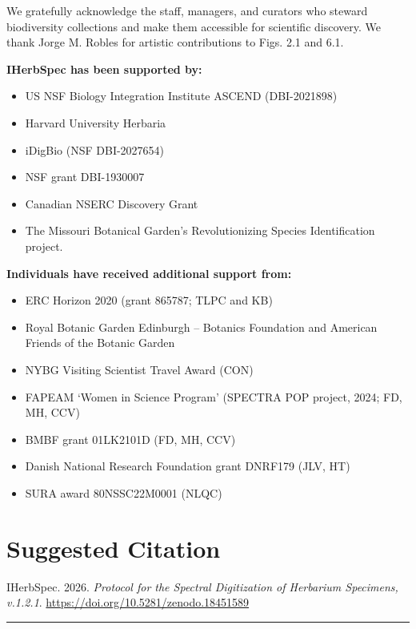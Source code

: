 \documentclass[
  letterpaper,
  DIV=11,
  numbers=noendperiod]{scrreprt}
\providecommand{\tightlist}{%
  \setlength{\itemsep}{0pt}\setlength{\parskip}{0pt}}
\begin{document}
We gratefully acknowledge the staff, managers, and curators who steward
biodiversity collections and make them accessible for scientific
discovery. We thank Jorge M. Robles for artistic contributions to Figs.
2.1 and 6.1.

\textbf{IHerbSpec has been supported by:}

\begin{itemize}
\tightlist
\item
  US NSF Biology Integration Institute ASCEND (DBI-2021898)
\item
  Harvard University Herbaria
\item
  iDigBio (NSF DBI-2027654)
\item
  NSF grant DBI-1930007
\item
  Canadian NSERC Discovery Grant
\item
  The Missouri Botanical Garden's Revolutionizing Species Identification
  project.
\end{itemize}

\textbf{Individuals have received additional support from:}

\begin{itemize}
\tightlist
\item
  ERC Horizon 2020 (grant 865787; TLPC and KB)
\item
  Royal Botanic Garden Edinburgh -- Botanics Foundation and American
  Friends of the Botanic Garden
\item
  NYBG Visiting Scientist Travel Award (CON)
\item
  FAPEAM `Women in Science Program' (SPECTRA POP project, 2024; FD, MH,
  CCV)
\item
  BMBF grant 01LK2101D (FD, MH, CCV)
\item
  Danish National Research Foundation grant DNRF179 (JLV, HT)
\item
  SURA award 80NSSC22M0001 (NLQC)
\end{itemize}

\section{Suggested Citation}\label{suggested-citation}

IHerbSpec. 2026. \emph{Protocol for the Spectral Digitization of
Herbarium Specimens, v.1.2.1}.
\url{https://doi.org/10.5281/zenodo.18451589}

\begin{center}\rule{0.5\linewidth}{0.5pt}\end{center}
\end{document}
